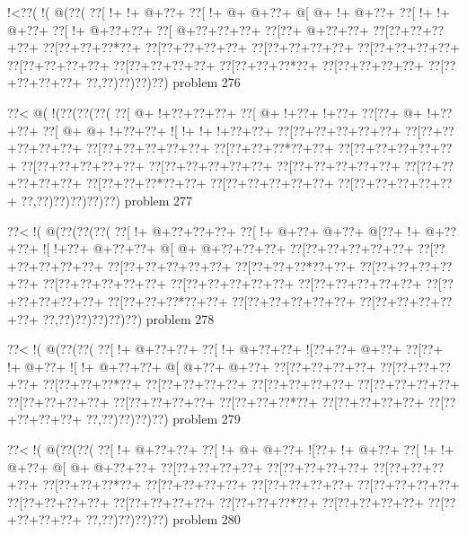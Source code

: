 \vbox{\vbox{\goo
\- !<\0??(\- !(\- @(\0??(
\0??[\- !+\- !+\- @+\0??+
\0??[\- !+\- @+\- @+\0??+
\- @[\- @+\- !+\- @+\0??+
\0??[\- !+\- !+\- @+\0??+
\0??[\- !+\- @+\0??+\0??+
\0??[\- @+\0??+\0??+\0??+
\0??[\0??+\- @+\0??+\0??+
\0??[\0??+\0??+\0??+\0??+
\0??[\0??+\0??+\0??*\0??+
\0??[\0??+\0??+\0??+\0??+
\0??[\0??+\0??+\0??+\0??+
\0??[\0??+\0??+\0??+\0??+
\0??[\0??+\0??+\0??+\0??+
\0??[\0??+\0??+\0??+\0??+
\0??[\0??+\0??+\0??*\0??+
\0??[\0??+\0??+\0??+\0??+
\0??[\0??+\0??+\0??+\0??+
\0??,\0??)\0??)\0??)\0??)
}
\hfil problem 276\hfil\break
}

\vbox{\vbox{\goo
\0??<\- @(\- !(\0??(\0??(\0??(
\0??[\- @+\- !+\0??+\0??+\0??+
\0??[\- @+\- !+\0??+\- !+\0??+
\0??[\0??+\- @+\- !+\0??+\0??+
\0??[\- @+\- @+\- !+\0??+\0??+
\- ![\- !+\- !+\- !+\0??+\0??+
\0??[\0??+\0??+\0??+\0??+\0??+
\0??[\0??+\0??+\0??+\0??+\0??+
\0??[\0??+\0??+\0??+\0??+\0??+
\0??[\0??+\0??+\0??*\0??+\0??+
\0??[\0??+\0??+\0??+\0??+\0??+
\0??[\0??+\0??+\0??+\0??+\0??+
\0??[\0??+\0??+\0??+\0??+\0??+
\0??[\0??+\0??+\0??+\0??+\0??+
\0??[\0??+\0??+\0??+\0??+\0??+
\0??[\0??+\0??+\0??*\0??+\0??+
\0??[\0??+\0??+\0??+\0??+\0??+
\0??[\0??+\0??+\0??+\0??+\0??+
\0??,\0??)\0??)\0??)\0??)\0??)
}
\hfil problem 277\hfil\break
}

\vbox{\vbox{\goo
\0??<\- !(\- @(\0??(\0??(\0??(
\0??[\- !+\- @+\0??+\0??+\0??+
\0??[\- !+\- @+\0??+\- @+\0??+
\- @[\0??+\- !+\- @+\0??+\0??+
\- ![\- !+\0??+\- @+\0??+\0??+
\- @[\- @+\- @+\0??+\0??+\0??+
\0??[\0??+\0??+\0??+\0??+\0??+
\0??[\0??+\0??+\0??+\0??+\0??+
\0??[\0??+\0??+\0??+\0??+\0??+
\0??[\0??+\0??+\0??*\0??+\0??+
\0??[\0??+\0??+\0??+\0??+\0??+
\0??[\0??+\0??+\0??+\0??+\0??+
\0??[\0??+\0??+\0??+\0??+\0??+
\0??[\0??+\0??+\0??+\0??+\0??+
\0??[\0??+\0??+\0??+\0??+\0??+
\0??[\0??+\0??+\0??*\0??+\0??+
\0??[\0??+\0??+\0??+\0??+\0??+
\0??[\0??+\0??+\0??+\0??+\0??+
\0??,\0??)\0??)\0??)\0??)\0??)
}
\hfil problem 278\hfil\break
}

\vbox{\vbox{\goo
\0??<\- !(\- @(\0??(\0??(
\0??[\- !+\- @+\0??+\0??+
\0??[\- !+\- @+\0??+\0??+
\- ![\0??+\0??+\- @+\0??+
\0??[\0??+\- !+\- @+\0??+
\- ![\- !+\- @+\0??+\0??+
\- @[\- @+\0??+\- @+\0??+
\0??[\0??+\0??+\0??+\0??+
\0??[\0??+\0??+\0??+\0??+
\0??[\0??+\0??+\0??*\0??+
\0??[\0??+\0??+\0??+\0??+
\0??[\0??+\0??+\0??+\0??+
\0??[\0??+\0??+\0??+\0??+
\0??[\0??+\0??+\0??+\0??+
\0??[\0??+\0??+\0??+\0??+
\0??[\0??+\0??+\0??*\0??+
\0??[\0??+\0??+\0??+\0??+
\0??[\0??+\0??+\0??+\0??+
\0??,\0??)\0??)\0??)\0??)
}
\hfil problem 279\hfil\break
}

\vbox{\vbox{\goo
\0??<\- !(\- @(\0??(\0??(
\0??[\- !+\- @+\0??+\0??+
\0??[\- !+\- @+\- @+\0??+
\- ![\0??+\- !+\- @+\0??+
\0??[\- !+\- !+\- @+\0??+
\- @[\- @+\- @+\0??+\0??+
\0??[\0??+\0??+\0??+\0??+
\0??[\0??+\0??+\0??+\0??+
\0??[\0??+\0??+\0??+\0??+
\0??[\0??+\0??+\0??*\0??+
\0??[\0??+\0??+\0??+\0??+
\0??[\0??+\0??+\0??+\0??+
\0??[\0??+\0??+\0??+\0??+
\0??[\0??+\0??+\0??+\0??+
\0??[\0??+\0??+\0??+\0??+
\0??[\0??+\0??+\0??*\0??+
\0??[\0??+\0??+\0??+\0??+
\0??[\0??+\0??+\0??+\0??+
\0??,\0??)\0??)\0??)\0??)
}
\hfil problem 280\hfil\break
}

